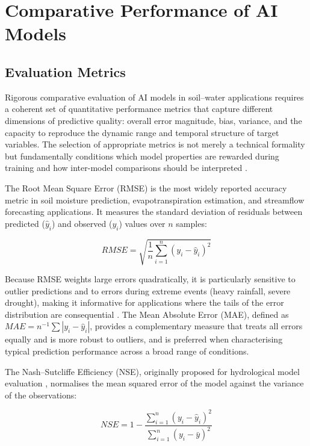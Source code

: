 \documentclass[land,article,submit,pdftex,moreauthors]{Definitions/mdpi}
\numberwithin{equation}{section}
\begin{document}
\section{Comparative Performance of AI Models}

\subsection{Evaluation Metrics}

Rigorous comparative evaluation of AI models in soil--water applications requires a coherent set of quantitative performance metrics that capture different dimensions of predictive quality: overall error magnitude, bias, variance, and the capacity to reproduce the dynamic range and temporal structure of target variables. The selection of appropriate metrics is not merely a technical formality but fundamentally conditions which model properties are rewarded during training and how inter-model comparisons should be interpreted \citep{moges2021review}.

The Root Mean Square Error (RMSE) is the most widely reported accuracy metric in soil moisture prediction, evapotranspiration estimation, and streamflow forecasting applications. It measures the standard deviation of residuals between predicted ($\hat{y}_i$) and observed ($y_i$) values over $n$ samples:

\begin{equation}
RMSE=\sqrt{\frac{1}{n}\sum_{i=1}^{n}(y_i-\hat{y}_i)^2}
\end{equation}

Because RMSE weights large errors quadratically, it is particularly sensitive to outlier predictions and to errors during extreme events (heavy rainfall, severe drought), making it informative for applications where the tails of the error distribution are consequential \citep{moges2021review}. The Mean Absolute Error (MAE), defined as $MAE = n^{-1}\sum|y_i - \hat{y}_i|$, provides a complementary measure that treats all errors equally and is more robust to outliers, and is preferred when characterising typical prediction performance across a broad range of conditions.

The Nash--Sutcliffe Efficiency (NSE), originally proposed for hydrological model evaluation \citep{nash1970river}, normalises the mean squared error of the model against the variance of the observations:

\begin{equation}
NSE = 1 - \frac{\sum_{i=1}^{n}(y_i - \hat{y}_i)^2}{\sum_{i=1}^{n}(y_i - \bar{y})^2}
\end{equation}
\end{document}
